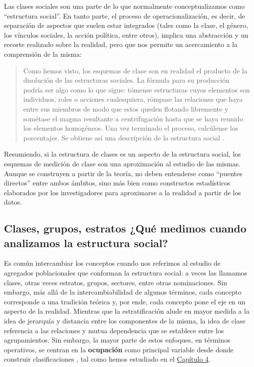 \documentclass[
]{book}
\begin{document}
Las clases sociales son una parte de lo que normalmente conceptualizamos como ``estructura social''. En tanto parte, el proceso de operacionalización, es decir, de separación de aspectos que suelen estar integrados (tales como la clase, el género, los vínculos sociales, la acción política, entre otros), implica una abstracción y un recorte realizado sobre la realidad, pero que nos permite un acercamiento a la comprensión de la misma:

\begin{quote}
Como hemos visto, los esquemas de clase son en realidad el producto de la disolución de las estructuras sociales. La fórmula para su producción podría ser algo como lo que sigue: tómense estructuras cuyos elementos son individuos, roles o acciones cualesquiera, rómpase las relaciones que haya entre sus miembros de modo que estos queden flotando libremente y sométase el magma resultante a centrifugación hasta que se haya reunido los elementos homogéneos. Una vez terminado el proceso, calcúlense los porcentajes. Se obtiene así una descripción de la estructura social \citep[pp.~85]{Carabana1997}.
\end{quote}

Resumiendo, si la estructura de clases es un aspecto de la estructura social, los esquemas de medición de clase son una aproximación al estudio de las mismas. Aunque se construyen a partir de la teoría, no deben entenderse como ``puentes directos'' entre ambos ámbitos, sino más bien como constructos estadísticos elaborados por los investigadores para aproximarse a la realidad a partir de los datos.

\hypertarget{clases-grupos-estratos-quuxe9-medimos-cuando-analizamos-la-estructura-social}{%
\subsection{Clases, grupos, estratos ¿Qué medimos cuando analizamos la estructura social?}\label{clases-grupos-estratos-quuxe9-medimos-cuando-analizamos-la-estructura-social}}

Es común intercambiar los conceptos cuando nos referimos al estudio de agregados poblacionales que conforman la estructura social: a veces las llamamos clases, otras veces estratos, grupos, sectores, entre otras nominaciones. Sin embargo, más allá de la intercambiabilidad de algunos términos, cada concepto corresponde a una tradición teórica y, por ende, cada concepto pone el eje en un aspecto de la realidad. Mientras que la estratificación alude en mayor medida a la idea de jerarquía y distancia entre los componentes de la misma, la idea de clase referencia a las relaciones y mutua dependencia que se establece entre los agrupamientos. Sin embargo, la mayor parte de estos enfoques, en términos operativos, se centran en la \textbf{ocupación} como principal variable desde donde construir clasificaciones \citep{FrancesGarcia2009, Barozet2007}, tal como hemos estudiado en el \protect\hyperlink{ocupacion}{Capítulo 4}.
\end{document}
